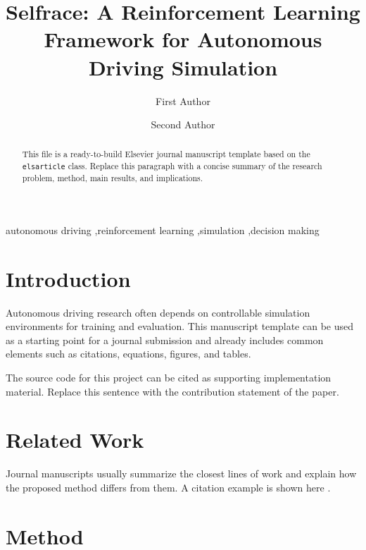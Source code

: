 \documentclass[preprint,12pt]{elsarticle}
\begin{document}
\begin{frontmatter}

\title{Selfrace: A Reinforcement Learning Framework for Autonomous Driving Simulation}

\author[inst1]{First Author}
\author[inst1]{Second Author}


\begin{abstract}
This file is a ready-to-build Elsevier journal manuscript template based on
the \texttt{elsarticle} class. Replace this paragraph with a concise summary
of the research problem, method, main results, and implications.
\end{abstract}

\begin{keyword}
autonomous driving \sep reinforcement learning \sep simulation \sep decision making
\end{keyword}

\end{frontmatter}

\section{Introduction}

Autonomous driving research often depends on controllable simulation
environments for training and evaluation. This manuscript template can be used
as a starting point for a journal submission and already includes common
elements such as citations, equations, figures, and tables.

The source code for this project can be cited as supporting implementation
material. Replace this sentence with the contribution statement of the paper.

\section{Related Work}

Journal manuscripts usually summarize the closest lines of work and explain
how the proposed method differs from them. A citation example is shown here
\citep{sutton2018reinforcement}.

\section{Method}
\end{document}
